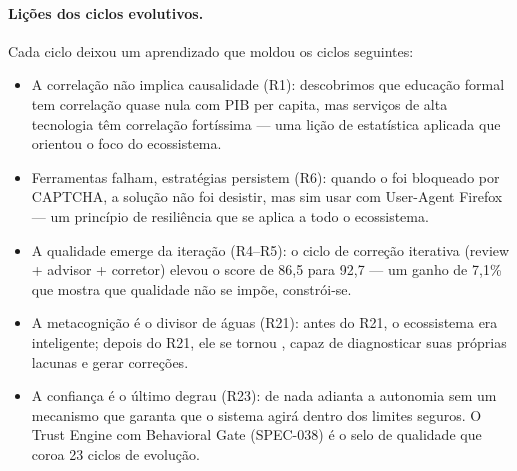 \paragraph*{Lições dos ciclos evolutivos.} Cada ciclo deixou um aprendizado
que moldou os ciclos seguintes:
\begin{itemize}
  \item A correlação não implica causalidade (R1): descobrimos que educação
        formal tem correlação quase nula com PIB per capita, mas serviços de
        alta tecnologia têm correlação fortíssima --- uma lição de
        estatística aplicada que orientou o foco do ecossistema.
  \item Ferramentas falham, estratégias persistem (R6): quando o 
        foi bloqueado por CAPTCHA, a solução não foi desistir, mas sim usar
         com User-Agent Firefox --- um princípio de resiliência
        que se aplica a todo o ecossistema.
  \item A qualidade emerge da iteração (R4--R5): o ciclo de correção
        iterativa (review + advisor + corretor) elevou o score de 86,5 para
        92,7 --- um ganho de 7,1\% que mostra que qualidade não se impõe,
        constrói-se.
  \item A metacognição é o divisor de águas (R21): antes do R21, o
        ecossistema era inteligente; depois do R21, ele se tornou
        , capaz de diagnosticar suas
        próprias lacunas e gerar correções.
  \item A confiança é o último degrau (R23): de nada adianta a autonomia
        sem um mecanismo que garanta que o sistema agirá dentro dos limites
        seguros. O Trust Engine com Behavioral Gate (SPEC-038) é o selo de
        qualidade que coroa 23 ciclos de evolução.
\end{itemize}

